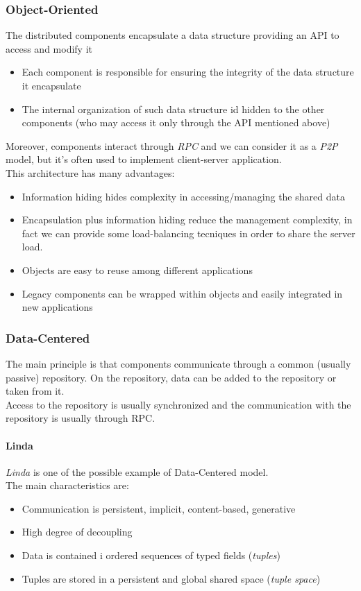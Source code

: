     \subsubsection{Object-Oriented}
    The distributed components encapsulate a data structure providing an API to access
    and modify it
    \begin{itemize}
        \item Each component is responsible for ensuring the integrity of the data structure
            it encapsulate
        \item The internal organization of such data structure id hidden to the other components
            (who may access it only through the API mentioned above)
    \end{itemize}
    Moreover, components interact through \textit{RPC} and we can consider it as a \textit{P2P} model,
    but it's often used to implement client-server application.\\
    This architecture has many advantages:
    \begin{itemize}
        \item Information hiding hides complexity in accessing/managing the shared data
        \item Encapsulation plus information hiding reduce the management complexity, in fact we
            can provide some load-balancing tecniques in order to share the server load.
        \item Objects are easy to reuse among different applications
        \item Legacy components can be wrapped within objects and easily integrated in new applications
    \end{itemize}

    \subsubsection{Data-Centered}
    The main principle is that components communicate through a common (usually passive) repository.
    On the repository, data can be added to the repository or taken from it.\\
    Access to the repository is usually synchronized and the communication with the 
    repository is usually through RPC.

    \paragraph{Linda}
    \textit{Linda} is one of the possible example of Data-Centered model.\\
    The main characteristics are:
    \begin{itemize}
        \item Communication is persistent, implicit, content-based, generative
        \item High degree of decoupling
        \item Data is contained i ordered sequences of typed fields (\textit{tuples})
        \item Tuples are stored in a persistent and global shared space (\textit{tuple space})
    \end{itemize}

